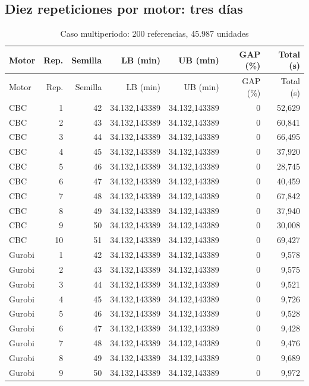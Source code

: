 \documentclass[12pt,a4paper,oneside]{article}
\begin{document}
\subsection{Diez repeticiones por motor: tres días}
{\small\setlength{\tabcolsep}{4pt}
\begin{longtable}{lrrrrrr}
\caption{Caso multiperiodo: 200 referencias, 45.987 unidades}\label{tab:60b}\\
\toprule Motor&Rep.&Semilla&LB (min)&UB (min)&GAP (\%)&Total (s)\\\midrule\endfirsthead
\toprule Motor&Rep.&Semilla&LB (min)&UB (min)&GAP (\%)&Total (s)\\\midrule\endhead
\bottomrule\endfoot
CBC & 1 & 42 & 34.132,143389 & 34.132,143389 & 0 & 52,629 \\
CBC & 2 & 43 & 34.132,143389 & 34.132,143389 & 0 & 60,841 \\
CBC & 3 & 44 & 34.132,143389 & 34.132,143389 & 0 & 66,495 \\
CBC & 4 & 45 & 34.132,143389 & 34.132,143389 & 0 & 37,920 \\
CBC & 5 & 46 & 34.132,143389 & 34.132,143389 & 0 & 28,745 \\
CBC & 6 & 47 & 34.132,143389 & 34.132,143389 & 0 & 40,459 \\
CBC & 7 & 48 & 34.132,143389 & 34.132,143389 & 0 & 67,842 \\
CBC & 8 & 49 & 34.132,143389 & 34.132,143389 & 0 & 37,940 \\
CBC & 9 & 50 & 34.132,143389 & 34.132,143389 & 0 & 30,008 \\
CBC & 10 & 51 & 34.132,143389 & 34.132,143389 & 0 & 69,427 \\
Gurobi & 1 & 42 & 34.132,143389 & 34.132,143389 & 0 & 9,578 \\
Gurobi & 2 & 43 & 34.132,143389 & 34.132,143389 & 0 & 9,575 \\
Gurobi & 3 & 44 & 34.132,143389 & 34.132,143389 & 0 & 9,521 \\
Gurobi & 4 & 45 & 34.132,143389 & 34.132,143389 & 0 & 9,726 \\
Gurobi & 5 & 46 & 34.132,143389 & 34.132,143389 & 0 & 9,528 \\
Gurobi & 6 & 47 & 34.132,143389 & 34.132,143389 & 0 & 9,428 \\
Gurobi & 7 & 48 & 34.132,143389 & 34.132,143389 & 0 & 9,476 \\
Gurobi & 8 & 49 & 34.132,143389 & 34.132,143389 & 0 & 9,689 \\
Gurobi & 9 & 50 & 34.132,143389 & 34.132,143389 & 0 & 9,972 \\

\end{longtable}}
\end{document}
